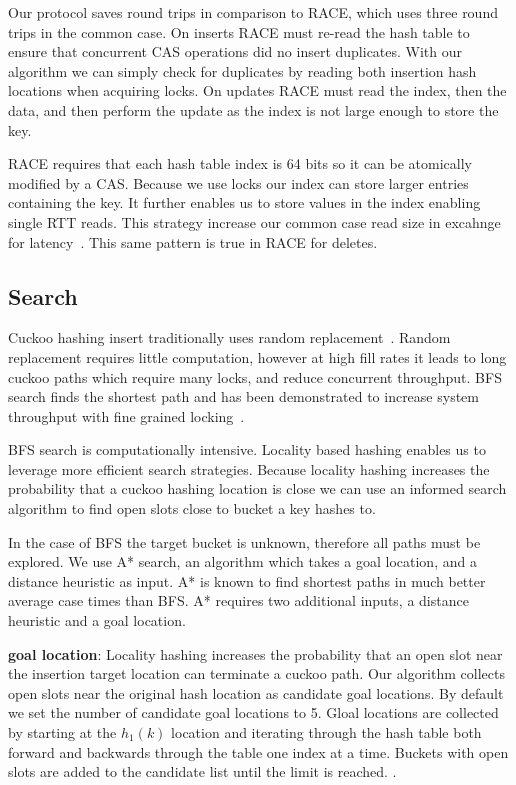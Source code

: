 Our protocol saves round trips in comparison to RACE, which
uses three round trips in the common case. On inserts RACE
must re-read the hash table to ensure that concurrent CAS
operations did no insert duplicates. With our algorithm we
can simply check for duplicates by reading both insertion
hash locations when acquiring locks. On updates RACE must
read the index, then the data, and then perform the update
as the index is not large enough to store the key. 

RACE requires that each hash table index is 64 bits so it
can be atomically modified by a CAS. Because we use locks
our index can store larger entries containing the key. It
further enables us to store values in the index enabling
single RTT reads. This strategy increase our common case
read size in excahnge for latency~.
This same pattern is true in RACE for deletes. 

\subsection{Search}
Cuckoo hashing insert traditionally uses random
replacement~\cite{cuckoo}. Random replacement requires
little computation, however at high fill rates it leads to
long cuckoo paths which require many locks, and reduce
concurrent throughput. BFS search finds the shortest path
and has been demonstrated to increase system throughput with
fine grained locking~\cite{algorithmic-improvements}.

BFS search is computationally intensive. Locality based
hashing enables us to leverage more efficient search
strategies. Because locality hashing increases the
probability that a cuckoo hashing location is close we can
use an informed search algorithm to find open slots close to
bucket a key hashes to. 

In the case of BFS the target bucket is unknown, therefore
all paths must be explored. We use A* search, an algorithm
which takes a goal location, and a distance heuristic as
input. A* is known to find shortest paths in much better
average case times than BFS. A* requires two additional
inputs, a distance heuristic and a goal location.

\textbf{goal location}: Locality hashing increases the
probability that an open slot near the insertion target
location can terminate a cuckoo path. Our algorithm collects
open slots near the original hash location as candidate goal
locations. By default we set the number of candidate goal
locations to 5. Gloal locations are collected by starting at
the $h_1(k)$ location and iterating through the hash
table both forward and backwards through the table one index
at a time. Buckets with open slots are added to the
candidate list until the limit is reached. .

